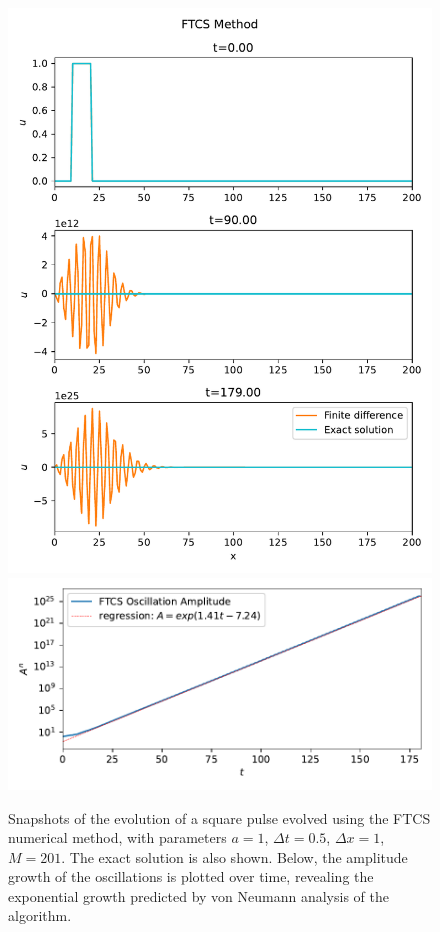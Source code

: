 \documentclass[%
 reprint,
 amsmath,amssymb,
 aps,
]{revtex4-2}
\begin{document}
\begin{figure}
\includegraphics[width=0.9\linewidth]{proj2-1/snapshots-ftcs-instability.pdf}
\includegraphics[width=0.9\linewidth]{proj2-1/ftcs-error-growth.pdf}
\caption{\label{fig:ftcs-instability}Snapshots of the evolution of a square pulse evolved using the FTCS numerical method, with parameters $a=1$, $\Delta t=0.5$, $\Delta x=1$, $M=201$. The exact solution is also shown. Below, the amplitude growth of the oscillations is plotted over time, revealing the exponential growth predicted by von Neumann analysis of the algorithm.}
\end{figure}
\end{document}
